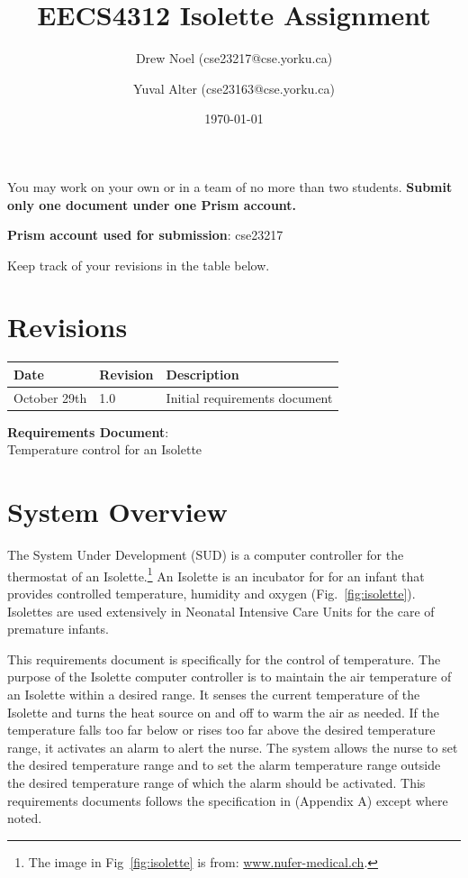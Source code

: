 \documentclass[fontsize=12pt,paper=letter,twoside]{scrartcl}
\title{EECS4312 Isolette Assignment}
\author{Drew Noel (cse23217@cse.yorku.ca)
\and{Yuval Alter (cse23163@cse.yorku.ca)}
}
\date{\today} %
\begin{document}
\maketitle

\noindent You may work on your own or in a team of no more than two students. \textbf{Submit only one document under one Prism account.}

\bigskip
\noindent \textbf{Prism account used for submission}: cse23217

\bigskip\noindent
Keep track of your revisions in the table below.

\section*{Revisions}

\begin{tabular}{|l|l|p{3in}|}
\hline
Date & Revision& Description \\
\hline
October 29th
& 1.0
& Initial requirements document\\
\hline
\end{tabular}

\newpage

\vspace*{2in}
\begin{center}
\huge{\textbf{Requirements Document}:\\ Temperature control for an Isolette}
\end{center}

\newpage

\tableofcontents
\listoffigures
\listoftables
\newpage

\section{System Overview}

The System Under Development (SUD) is a computer controller for the thermostat of an Isolette.\footnote{%
The image in Fig~\ref{fig:isolette} is from: \url{www.nufer-medical.ch}.}
An Isolette is an incubator for for an infant that provides controlled temperature, humidity and oxygen (Fig.~\ref{fig:isolette}). Isolettes are used extensively in Neonatal Intensive Care Units for the care of premature infants.

This requirements document is specifically for the control of temperature. The purpose of the Isolette computer controller is to maintain the air temperature of an Isolette within a desired range. It senses the current temperature of the Isolette and turns the heat source on and off to warm the air as needed. If the temperature falls too far below or rises too far above the desired temperature range, it activates an alarm to alert the nurse. The system allows the nurse to set the desired temperature range and to set the alarm temperature range outside the desired temperature range of which the alarm should be activated. This requirements documents follows the specification in \cite{REMH} (Appendix A) except where noted.
\end{document}
